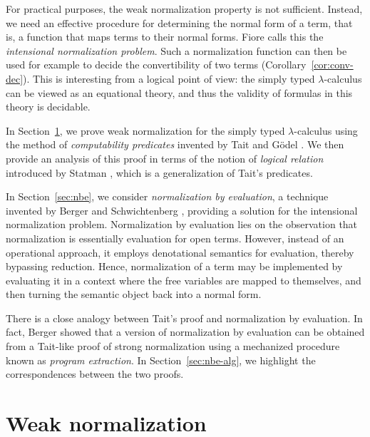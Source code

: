 For practical purposes, the weak normalization property is not sufficient. Instead, we need an effective procedure for determining the normal form of a term, that is, a function that maps terms to their normal forms. Fiore \cite{fiore:2002:ppdp, fiore:2022:mscs} calls this the \textit{intensional normalization problem}. Such a normalization function can then be used for example to decide the convertibility of two terms (Corollary~\ref{cor:conv-dec}). This is interesting from a logical point of view: the simply typed $\lambda$-calculus can be viewed as an equational theory, and thus the validity of formulas in this theory is decidable.

In Section~\ref{sec:weak-norm}, we prove weak normalization for the simply typed $\lambda$-calculus using the method of \textit{computability predicates} invented by Tait \cite{tait:1967:jsl} and Gödel \cite{godel1958}. We then provide an analysis of this proof in terms of the notion of \textit{logical relation} introduced by Statman \cite{statman:1985:ic}, which is a generalization of Tait's predicates.

In Section~\ref{sec:nbe}, we consider \textit{normalization by evaluation}, a technique invented by Berger and Schwichtenberg \cite{DBLP:conf/lics/BergerS91}, providing a solution for the intensional normalization problem. Normalization by evaluation lies on the observation that normalization is essentially evaluation for open terms. However, instead of an operational approach, it employs denotational semantics for evaluation, thereby bypassing reduction. Hence, normalization of a term may be implemented by evaluating it in a context where the free variables are mapped to themselves, and then turning the semantic object back into a normal form.

There is a close analogy between Tait's proof and normalization by evaluation. In fact, Berger showed \cite{berger:1993:tlca, berger:2006:sl} that a version of normalization by evaluation can be obtained from a Tait-like proof of strong normalization using a mechanized procedure known as \textit{program extraction}. In Section~\ref{sec:nbe-alg}, we highlight the correspondences between the two proofs.

\section{Weak normalization} \label{sec:weak-norm}

